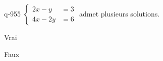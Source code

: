 \begin{truefalse}{q-955}
$\begin{cases}2x-y &= 3 \\ 4x-2y &= 6\end{cases}$ admet plusieurs solutions.
\item* Vrai
\item Faux
\end{truefalse}

